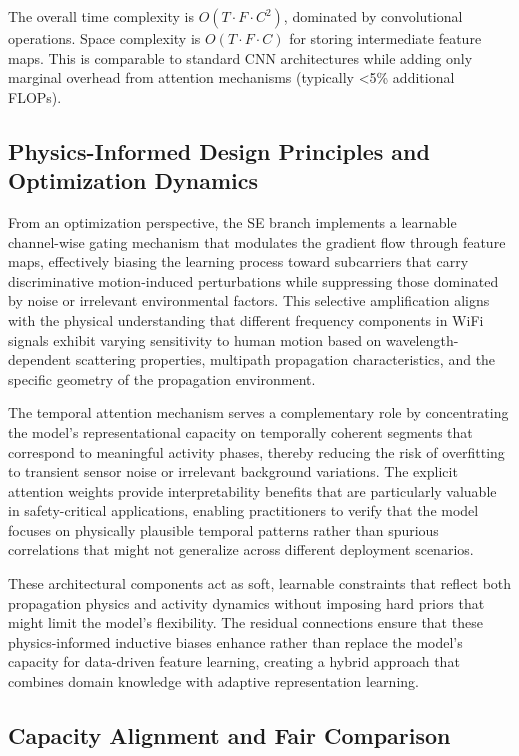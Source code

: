 \documentclass[lettersize,journal]{IEEEtran}
\begin{document}
The overall time complexity is $O(T \cdot F \cdot C^2)$, dominated by convolutional operations. Space complexity is $O(T \cdot F \cdot C)$ for storing intermediate feature maps. This is comparable to standard CNN architectures while adding only marginal overhead from attention mechanisms (typically <5\% additional FLOPs).

\subsection{Physics-Informed Design Principles and Optimization Dynamics}

From an optimization perspective, the SE branch implements a learnable channel-wise gating mechanism that modulates the gradient flow through feature maps, effectively biasing the learning process toward subcarriers that carry discriminative motion-induced perturbations while suppressing those dominated by noise or irrelevant environmental factors. This selective amplification aligns with the physical understanding that different frequency components in WiFi signals exhibit varying sensitivity to human motion based on wavelength-dependent scattering properties, multipath propagation characteristics, and the specific geometry of the propagation environment.

The temporal attention mechanism serves a complementary role by concentrating the model's representational capacity on temporally coherent segments that correspond to meaningful activity phases, thereby reducing the risk of overfitting to transient sensor noise or irrelevant background variations. The explicit attention weights provide interpretability benefits that are particularly valuable in safety-critical applications, enabling practitioners to verify that the model focuses on physically plausible temporal patterns rather than spurious correlations that might not generalize across different deployment scenarios.

These architectural components act as soft, learnable constraints that reflect both propagation physics and activity dynamics without imposing hard priors that might limit the model's flexibility. The residual connections ensure that these physics-informed inductive biases enhance rather than replace the model's capacity for data-driven feature learning, creating a hybrid approach that combines domain knowledge with adaptive representation learning.

\subsection{Capacity Alignment and Fair Comparison}
\end{document}
